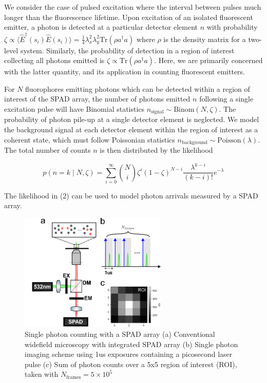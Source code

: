 \documentclass[a4paper, twocolumn, superscriptaddress,prl]{revtex4}  %
\begin{document}
We consider the case of pulsed excitation where the interval between pulses much longer than the fluorescence lifetime. Upon excitation of an isolated fluorescent emitter, a photon is detected at a particular detector element $n$ with probability $\zeta\propto \langle \hat{E}^{\dagger}(s_i)\hat{E}(s_i)\rangle = \frac{1}{4}\lambda_{x}^2 \lambda_{y}^2\mathrm{Tr}(\rho a^{\dagger}a)$ where $\rho$ is the density matrix for a two-level system. Similarly, the probability of detection in a region of interest collecting all photons emitted is $\zeta\propto \mathrm{Tr}(\rho a^{\dagger}a)$. Here, we are primarily concerned with the latter quantity, and its application in counting fluorescent emitters.

For $N$ fluorophores emitting photons which can be detected within a region of interest of the SPAD array, the number of photons emitted $n$ following a single excitation pulse will have Binomial statistics $n_{\mathrm{signal}} \sim \mathrm{Binom}(N,\zeta)$. The probability of photon pile-up at a single detector element is neglected. We model the background signal at each detector element within the region of interest as a coherent state, which must follow Poissonian statistics $n_{\mathrm{background}} \sim \mathrm{Poisson}(\lambda)$. The total number of counts $n$ is then distributed by the likelihood

\begin{equation}
p(n=k \mid N, \zeta) = \sum_{i=0}^{\infty} \binom{N}{i} \zeta^i (1-\zeta)^{N-i} \frac{\lambda^{k-i}}{(k-i)!} e^{-\lambda}
\end{equation}

The likelihood in (2) can be used to model photon arrivals measured by a SPAD array.

\begin{figure}
\includegraphics[width=7cm]{Figure-0.png}
\caption{Single photon counting with a SPAD array (a) Conventional widefield microscopy with integrated SPAD array (b) Single photon imaging scheme using 1us exposures containing a picosecond laser pulse (c) Sum of photon counts over a 5x5 region of interest (ROI), taken with $N_{\mathrm{frames}}=5\times 10^{5}$}
\end{figure}    
\end{document}

